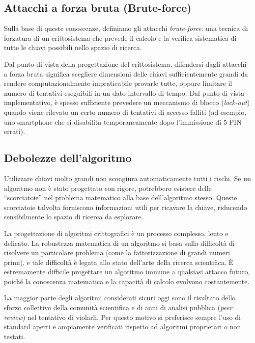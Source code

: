 \subsection{Attacchi a forza bruta (Brute-force)}\label{subsec:bruteforce}
Sulla base di queste conoscenze, definiamo gli attacchi \textit{brute-force}: una tecnica di forzatura di un crittosistema che prevede il calcolo e la verifica sistematica di tutte le chiavi possibili nello spazio di ricerca.

Dal punto di vista della progettazione del crittosistema, difendersi dagli attacchi a forza bruta significa scegliere dimensioni delle chiavi sufficientemente grandi da rendere computazionalmente impraticabile provarle tutte, oppure limitare il numero di tentativi eseguibili in un dato intervallo di tempo. Dal punto di vista implementativo, è spesso sufficiente prevedere un meccanismo di blocco (\textit{lock-out}) quando viene rilevato un certo numero di tentativi di accesso falliti (ad esempio, uno smartphone che si disabilita temporaneamente dopo l'immissione di $5$ PIN errati).


\subsection{Debolezze dell'algoritmo}\label{subsec:debolezze_algoritmo}
Utilizzare chiavi molto grandi non scongiura automaticamente tutti i rischi. Se un algoritmo non è stato progettato con rigore, potrebbero esistere delle \enquote{scorciatoie} nel problema matematico alla base dell'algoritmo stesso. Queste scorciatoie talvolta forniscono informazioni utili per ricavare la chiave, riducendo sensibilmente lo spazio di ricerca da esplorare.

La progettazione di algoritmi crittografici è un processo complesso, lento e delicato. La robustezza matematica di un algoritmo si basa sulla difficoltà di risolvere un particolare problema (come la fattorizzazione di grandi numeri primi), e tale difficoltà è legata allo stato dell'arte della ricerca scientifica. È estremamente difficile progettare un algoritmo immune a qualsiasi attacco futuro, poiché la conoscenza matematica e la capacità di calcolo evolvono costantemente.

La maggior parte degli algoritmi considerati sicuri oggi sono il risultato dello sforzo collettivo della comunità scientifica e di anni di analisi pubblica (\textit{peer review}) nel tentativo di violarli. Per questo motivo si preferisce sempre l'uso di standard aperti e ampiamente verificati rispetto ad algoritmi proprietari o non testati.

